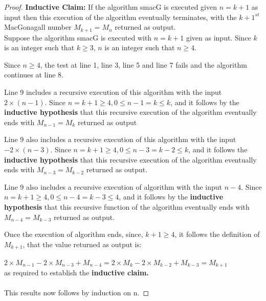 \documentclass[12pt]{article}
\begin{document}
\begin{proof}
    \noindent \textbf{Inductive Claim: } If the algorithm smacG is executed given $n = k + 1$ as input then this execution of the algorithm eventually terminates, with the $k+1^{st}$ MacGonagall number $M_{k+1} = M_n$ returned as output. \\
    
    \noindent Suppose the algorithm smacG is executed with $n= k + 1$ given as input. Since $k$ is an integer such that $k \geq 3$, $n$ is an integer such that $n \geq 4$.
    
    \noindent Since $n \geq 4$, the test at line 1, line 3, line 5 and line 7 fails and the algorithm continues at line 8. 
    
    \noindent Line 9 includes a recursive execution of this algorithm with the input $2 \times (n-1)$. Since $n = k + 1 \geq 4, 0 \leq n-1 = k \leq k$, and it follows by the \textbf{inductive hypothesis} that this recursive execution of the algorithm eventually ends with $M_{n-1} = M_k$ returned as output
    
    \noindent Line 9 also includes a recursive execution of this algorithm with the input $-2 \times (n-3)$. Since $n = k+1 \geq 4, 0 \leq n-3 = k-2 \leq k$, and it follows the \textbf{inductive hypothesis} that this recursive execution of the algorithm eventually ends with $M_{n-3} = M_{k-2}$ returned as output.
    
    \noindent Line 9 also includes a recursive execution of algorithm with the input $n-4$. Since $n = k+1 \geq 4, 0 \leq n-4 = k-3 \leq 4$, and it follows by the \textbf{inductive hypothesis} that this recursive function of the algorithm eventually ends with $M_{n-4} = M_{k-3}$ returned as output.
    
    \noindent Once the execution of algorithm ends, since, $k+1 \geq 4$, it follows the definition of $M_{k+1}$, that the value returned as output is: \\ \\
    $2 \times M_{n-1} - 2 \times M_{n-3} + M_{n-4} = 2 \times M_{k} -2 \times M_{k-2} + M_{k-3} = M_{k+1}$ \\ 
    
    \noindent as required to establish the \textbf{inductive claim.} \\ \\
    This results now follows by induction on n.
\end{proof}


\end{document}
